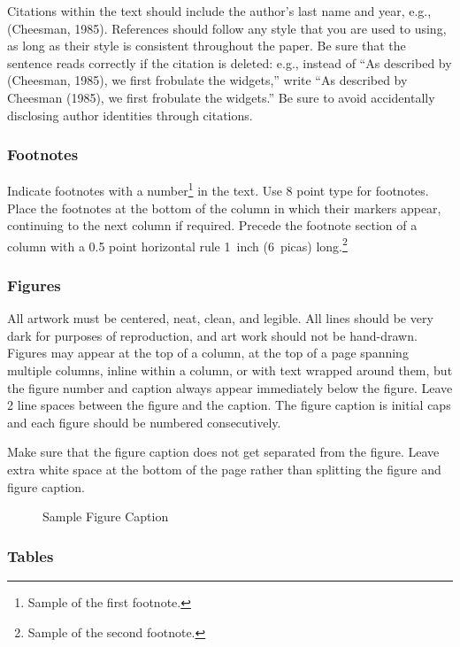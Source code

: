 \documentclass[twoside]{article} \usepackage{aistats2017}
\begin{document}
Citations within the text should include the author's last name and
year, e.g., (Cheesman, 1985). References should follow any style that
you are used to using, as long as their style is consistent throughout
the paper.  Be sure that the sentence reads correctly if the citation
is deleted: e.g., instead of ``As described by (Cheesman, 1985), we
first frobulate the widgets,'' write ``As described by Cheesman
(1985), we first frobulate the widgets.''  Be sure to avoid
accidentally disclosing author identities through citations.

\subsubsection{Footnotes}

Indicate footnotes with a number\footnote{Sample of the first
  footnote.} in the text. Use 8 point type for footnotes. Place the
footnotes at the bottom of the column in which their markers appear,
continuing to the next column if required. Precede the footnote
section of a column with a 0.5 point horizontal rule 1~inch (6~picas)
long.\footnote{Sample of the second footnote.}

\subsubsection{Figures}

All artwork must be centered, neat, clean, and legible.  All lines
should be very dark for purposes of reproduction, and art work should
not be hand-drawn.  Figures may appear at the top of a column, at the
top of a page spanning multiple columns, inline within a column, or
with text wrapped around them, but the figure number and caption
always appear immediately below the figure.  Leave 2 line spaces
between the figure and the caption. The figure caption is initial caps
and each figure should be numbered consecutively.

Make sure that the figure caption does not get separated from the
figure. Leave extra white space at the bottom of the page rather than
splitting the figure and figure caption.
\begin{figure}[h]
\vspace{.3in}
\centerline{}
\vspace{.3in}
\caption{Sample Figure Caption}
\end{figure}

\subsubsection{Tables}
\end{document}
